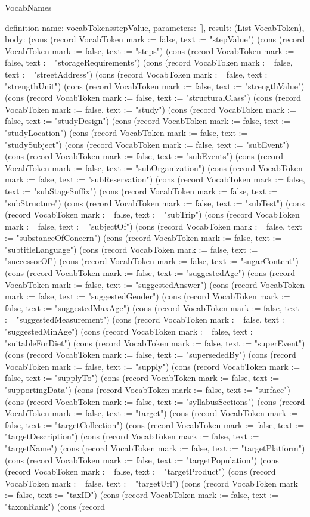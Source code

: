 \begin{lexlean}{VocabNames}
\begin{semanticmodule}
definition{
  name: vocabTokensstepValue,
  parameters: [],
  result: (List VocabToken),
  body: (cons (record VocabToken {mark := false, text := "stepValue"}) (cons (record VocabToken {mark := false, text := "steps"}) (cons (record VocabToken {mark := false, text := "storageRequirements"}) (cons (record VocabToken {mark := false, text := "streetAddress"}) (cons (record VocabToken {mark := false, text := "strengthUnit"}) (cons (record VocabToken {mark := false, text := "strengthValue"}) (cons (record VocabToken {mark := false, text := "structuralClass"}) (cons (record VocabToken {mark := false, text := "study"}) (cons (record VocabToken {mark := false, text := "studyDesign"}) (cons (record VocabToken {mark := false, text := "studyLocation"}) (cons (record VocabToken {mark := false, text := "studySubject"}) (cons (record VocabToken {mark := false, text := "subEvent"}) (cons (record VocabToken {mark := false, text := "subEvents"}) (cons (record VocabToken {mark := false, text := "subOrganization"}) (cons (record VocabToken {mark := false, text := "subReservation"}) (cons (record VocabToken {mark := false, text := "subStageSuffix"}) (cons (record VocabToken {mark := false, text := "subStructure"}) (cons (record VocabToken {mark := false, text := "subTest"}) (cons (record VocabToken {mark := false, text := "subTrip"}) (cons (record VocabToken {mark := false, text := "subjectOf"}) (cons (record VocabToken {mark := false, text := "substanceOfConcern"}) (cons (record VocabToken {mark := false, text := "subtitleLanguage"}) (cons (record VocabToken {mark := false, text := "successorOf"}) (cons (record VocabToken {mark := false, text := "sugarContent"}) (cons (record VocabToken {mark := false, text := "suggestedAge"}) (cons (record VocabToken {mark := false, text := "suggestedAnswer"}) (cons (record VocabToken {mark := false, text := "suggestedGender"}) (cons (record VocabToken {mark := false, text := "suggestedMaxAge"}) (cons (record VocabToken {mark := false, text := "suggestedMeasurement"}) (cons (record VocabToken {mark := false, text := "suggestedMinAge"}) (cons (record VocabToken {mark := false, text := "suitableForDiet"}) (cons (record VocabToken {mark := false, text := "superEvent"}) (cons (record VocabToken {mark := false, text := "supersededBy"}) (cons (record VocabToken {mark := false, text := "supply"}) (cons (record VocabToken {mark := false, text := "supplyTo"}) (cons (record VocabToken {mark := false, text := "supportingData"}) (cons (record VocabToken {mark := false, text := "surface"}) (cons (record VocabToken {mark := false, text := "syllabusSections"}) (cons (record VocabToken {mark := false, text := "target"}) (cons (record VocabToken {mark := false, text := "targetCollection"}) (cons (record VocabToken {mark := false, text := "targetDescription"}) (cons (record VocabToken {mark := false, text := "targetName"}) (cons (record VocabToken {mark := false, text := "targetPlatform"}) (cons (record VocabToken {mark := false, text := "targetPopulation"}) (cons (record VocabToken {mark := false, text := "targetProduct"}) (cons (record VocabToken {mark := false, text := "targetUrl"}) (cons (record VocabToken {mark := false, text := "taxID"}) (cons (record VocabToken {mark := false, text := "taxonRank"}) (cons (record }
\end{semanticmodule}
\end{lexlean}
